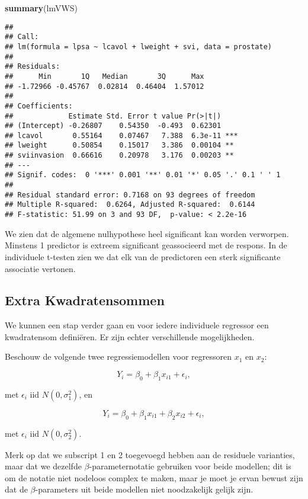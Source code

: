 \documentclass[
  12pt,dutch,coursenotes]{book}
\newenvironment{Shaded}{\begin{snugshade}}{\end{snugshade}}
\newcommand{\KeywordTok}[1]{\textcolor[rgb]{0.13,0.29,0.53}{\textbf{#1}}}
\newcommand{\NormalTok}[1]{#1}
\theoremstyle{definition}
\theoremstyle{definition}
\theoremstyle{definition}
\theoremstyle{remark}
\begin{document}
\begin{Shaded}
\begin{Highlighting}[]
\KeywordTok{summary}\NormalTok{(lmVWS)}
\end{Highlighting}
\end{Shaded}

\begin{verbatim}
## 
## Call:
## lm(formula = lpsa ~ lcavol + lweight + svi, data = prostate)
## 
## Residuals:
##      Min       1Q   Median       3Q      Max 
## -1.72966 -0.45767  0.02814  0.46404  1.57012 
## 
## Coefficients:
##             Estimate Std. Error t value Pr(>|t|)    
## (Intercept) -0.26807    0.54350  -0.493  0.62301    
## lcavol       0.55164    0.07467   7.388  6.3e-11 ***
## lweight      0.50854    0.15017   3.386  0.00104 ** 
## sviinvasion  0.66616    0.20978   3.176  0.00203 ** 
## ---
## Signif. codes:  0 '***' 0.001 '**' 0.01 '*' 0.05 '.' 0.1 ' ' 1
## 
## Residual standard error: 0.7168 on 93 degrees of freedom
## Multiple R-squared:  0.6264, Adjusted R-squared:  0.6144 
## F-statistic: 51.99 on 3 and 93 DF,  p-value: < 2.2e-16
\end{verbatim}

We zien dat de algemene nulhypothese heel significant kan worden verworpen. Minstens 1 predictor is extreem significant geassocieerd met de respons. In de individuele t-testen zien we dat elk van de predictoren een sterk significante associatie vertonen.

\hypertarget{extra-kwadratensommen}{%
\subsection{Extra Kwadratensommen}\label{extra-kwadratensommen}}

We kunnen een stap verder gaan en voor iedere individuele regressor een kwadratensom definiëren. Er zijn echter verschillende mogelijkheden.

Beschouw de volgende twee regressiemodellen voor regressoren \(x_1\) en \(x_2\):

\[
  Y_i = \beta_0+\beta_1 x_{i1} + \epsilon_i,
\]

met \(\epsilon_i\text{ iid } N(0,\sigma_1^{2})\), en

\[
Y_i = \beta_0+\beta_1 x_{i1}+\beta_2 x_{i2} + \epsilon_i,
\]

met \(\epsilon_i\text{ iid } N(0,\sigma_2^{2})\).

Merk op dat we subscript 1 en 2 toegevoegd hebben aan de residuele varianties, maar dat we dezelfde \(\beta\)-parameternotatie gebruiken voor beide modellen; dit is om de notatie niet nodeloos complex te maken, maar je moet je ervan bewust zijn dat de \(\beta\)-parameters uit beide modellen niet noodzakelijk gelijk zijn.
\end{document}
